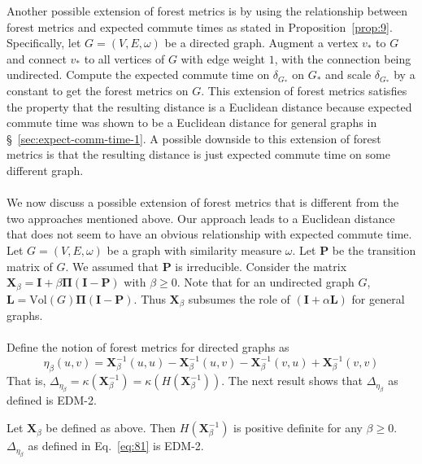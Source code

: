 Another possible extension of forest metrics is by using the
relationship between forest metrics and expected commute times as
stated in Proposition~\ref{prop:9}. Specifically, let $G =
(V,E,\omega)$ be a directed graph. Augment a vertex $v_{*}$ to $G$ and
connect $v_{*}$ to all vertices of $G$ with edge weight $1$, with the
connection being undirected. Compute the expected commute time on
$\delta_{G_{*}}$ on $G_*$ and scale $\delta_{G_{*}}$ by a constant to
get the forest metrics on $G$. This extension of forest metrics
satisfies the property that the resulting distance is a Euclidean
distance because expected commute time was shown to be a Euclidean
distance for general graphs in \S~\ref{sec:expect-comm-time-1}. A
possible downside to this extension of forest metrics is that the
resulting distance is just expected commute time on some
different graph. \\ \\
% 
% 
\noindent 
We now discuss a possible extension of forest metrics that is different
from the two approaches mentioned above. Our approach leads to a
Euclidean distance that does not seem to have an obvious relationship
with expected commute time. Let $G = (V,E,\omega)$ be a graph with
similarity measure $\omega$. Let $\mathbf{P}$ be the transition matrix
of $G$. We assumed that $\mathbf{P}$ is irreducible. Consider the
matrix $\mathbf{X}_{\beta} = \mathbf{I} + \beta \bm{\Pi}(\mathbf{I} -
\mathbf{P})$ with $\beta \geq 0$. Note that for an undirected graph
$G$, $\mathbf{L} = \mathrm{Vol}(G) \bm{\Pi}(\mathbf{I} -
\mathbf{P})$. Thus $\mathbf{X}_{\beta}$ subsumes the role of
$(\mathbf{I} + \alpha \mathbf{L})$ for general graphs. \\ \\
% 
% 
Define the notion of forest metrics for directed graphs as
\begin{equation}
  \label{eq:81}
  \eta_{\beta}(u,v) = \mathbf{X}_\beta^{-1}(u,u) - \mathbf{X}_\beta^{-1}(u,v) -
  \mathbf{X}_\beta^{-1}(v,u) + \mathbf{X}_\beta^{-1}(v,v) 
\end{equation}
That is, $\Delta_{\eta_{\beta}} = \kappa(\mathbf{X}_\beta^{-1}) =
\kappa(H(\mathbf{X}_\beta^{-1}))$. The next result shows that
$\Delta_{\eta_{\beta}}$ as defined is EDM-2.
\begin{proposition}
  \label{prop:23}
  Let $\mathbf{X}_{\beta}$ be defined as above. Then
  $H(\mathbf{X}_{\beta}^{-1})$ is
  positive definite for any $\beta \geq 0$. $\Delta_{\eta_{\beta}}$ as defined in
  Eq.~\eqref{eq:81} is EDM-2.
\end{proposition}
